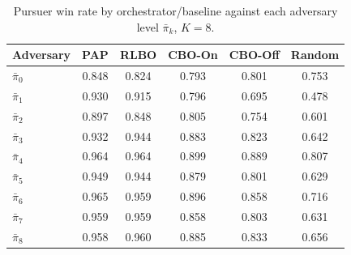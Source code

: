 %

\begin{table}[t]
\centering
\caption{Pursuer win rate by orchestrator/baseline against each adversary level $\bar\pi_k$, $K{=}8$.}
\label{tab:winrate-per-level}
\begin{tabular}{@{}lccccc@{}}
\toprule
Adversary & PAP & RLBO & CBO-On & CBO-Off & Random \\
\midrule
$\bar\pi_0$ & 0.848 & 0.824 & 0.793 & 0.801 & 0.753 \\
$\bar\pi_1$ & 0.930 & 0.915 & 0.796 & 0.695 & 0.478 \\
$\bar\pi_2$ & 0.897 & 0.848 & 0.805 & 0.754 & 0.601 \\
$\bar\pi_3$ & 0.932 & 0.944 & 0.883 & 0.823 & 0.642 \\
$\bar\pi_4$ & 0.964 & 0.964 & 0.899 & 0.889 & 0.807 \\
$\bar\pi_5$ & 0.949 & 0.944 & 0.879 & 0.801 & 0.629 \\
$\bar\pi_6$ & 0.965 & 0.959 & 0.896 & 0.858 & 0.716 \\
$\bar\pi_7$ & 0.959 & 0.959 & 0.858 & 0.803 & 0.631 \\
$\bar\pi_8$ & 0.958 & 0.960 & 0.885 & 0.833 & 0.656 \\
\bottomrule
\end{tabular}
\end{table}
